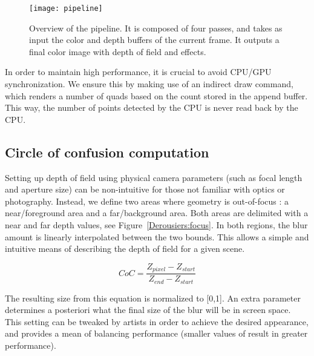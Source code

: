 	\begin{figure}[htb]\centering
	\texttt{[image: pipeline]}
	\caption{Overview of the pipeline. It is composed of four passes, and takes as input the color and depth buffers of the current frame. It outputs a final color image with depth of field and \bokeh effects.}
	\label{Derousiers:pipeline}
	\end{figure}

In order to maintain high performance, it is crucial to avoid CPU/GPU synchronization. We ensure this by making use of an indirect draw command, which renders a number of quads based on the count stored in the append buffer. This way, the number of \bokeh points detected by the CPU is never read back by the CPU.

\subsection{Circle of confusion computation}
Setting up depth of field using physical camera parameters (such as focal length and aperture size) can be non-intuitive for those not familiar with optics or photography. Instead, we define two areas where geometry is out-of-focus : a near/foreground area and a far/background area. Both areas are delimited with a near and far depth values, see Figure~\ref{Derousiers:focus}. In both regions, the blur amount is linearly interpolated between the two bounds. This allows a simple and intuitive means of describing the depth of field for a given scene.

$$
	CoC = \frac{Z_{pixel} - Z_{start} }{ Z_{end} - Z_{start} }
$$

The resulting \coc size from this equation is normalized to [0,1]. An extra parameter  determines a posteriori what the final size of the blur will be in screen space. This setting can be tweaked by artists in order to achieve the desired appearance, and provides a mean of balancing performance (smaller values of  result in greater performance).


